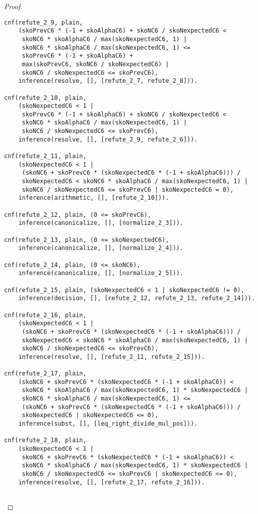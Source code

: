 \begin{proof}
\begin{verbatim}
cnf(refute_2_9, plain,
    (skoPrevC6 * (-1 + skoAlphaC6) + skoNC6 / skoNexpectedC6 <
     skoNC6 * skoAlphaC6 / max(skoNexpectedC6, 1) |
     skoNC6 * skoAlphaC6 / max(skoNexpectedC6, 1) <=
     skoPrevC6 * (-1 + skoAlphaC6) +
     max(skoPrevC6, skoNC6 / skoNexpectedC6) |
     skoNC6 / skoNexpectedC6 <= skoPrevC6),
    inference(resolve, [], [refute_2_7, refute_2_8])).

cnf(refute_2_10, plain,
    (skoNexpectedC6 < 1 |
     skoPrevC6 * (-1 + skoAlphaC6) + skoNC6 / skoNexpectedC6 <
     skoNC6 * skoAlphaC6 / max(skoNexpectedC6, 1) |
     skoNC6 / skoNexpectedC6 <= skoPrevC6),
    inference(resolve, [], [refute_2_9, refute_2_6])).

cnf(refute_2_11, plain,
    (skoNexpectedC6 < 1 |
     (skoNC6 + skoPrevC6 * (skoNexpectedC6 * (-1 + skoAlphaC6))) /
     skoNexpectedC6 < skoNC6 * skoAlphaC6 / max(skoNexpectedC6, 1) |
     skoNC6 / skoNexpectedC6 <= skoPrevC6 | skoNexpectedC6 = 0),
    inference(arithmetic, [], [refute_2_10])).

cnf(refute_2_12, plain, (0 <= skoPrevC6),
    inference(canonicalize, [], [normalize_2_3])).

cnf(refute_2_13, plain, (0 <= skoNexpectedC6),
    inference(canonicalize, [], [normalize_2_4])).

cnf(refute_2_14, plain, (0 <= skoNC6),
    inference(canonicalize, [], [normalize_2_5])).

cnf(refute_2_15, plain, (skoNexpectedC6 < 1 | skoNexpectedC6 != 0),
    inference(decision, [], [refute_2_12, refute_2_13, refute_2_14])).

cnf(refute_2_16, plain,
    (skoNexpectedC6 < 1 |
     (skoNC6 + skoPrevC6 * (skoNexpectedC6 * (-1 + skoAlphaC6))) /
     skoNexpectedC6 < skoNC6 * skoAlphaC6 / max(skoNexpectedC6, 1) |
     skoNC6 / skoNexpectedC6 <= skoPrevC6),
    inference(resolve, [], [refute_2_11, refute_2_15])).

cnf(refute_2_17, plain,
    (skoNC6 + skoPrevC6 * (skoNexpectedC6 * (-1 + skoAlphaC6)) <
     skoNC6 * skoAlphaC6 / max(skoNexpectedC6, 1) * skoNexpectedC6 |
     skoNC6 * skoAlphaC6 / max(skoNexpectedC6, 1) <=
     (skoNC6 + skoPrevC6 * (skoNexpectedC6 * (-1 + skoAlphaC6))) /
     skoNexpectedC6 | skoNexpectedC6 <= 0),
    inference(subst, [], [leq_right_divide_mul_pos])).

cnf(refute_2_18, plain,
    (skoNexpectedC6 < 1 |
     skoNC6 + skoPrevC6 * (skoNexpectedC6 * (-1 + skoAlphaC6)) <
     skoNC6 * skoAlphaC6 / max(skoNexpectedC6, 1) * skoNexpectedC6 |
     skoNC6 / skoNexpectedC6 <= skoPrevC6 | skoNexpectedC6 <= 0),
    inference(resolve, [], [refute_2_17, refute_2_16])).


\end{verbatim}
\end{proof}
